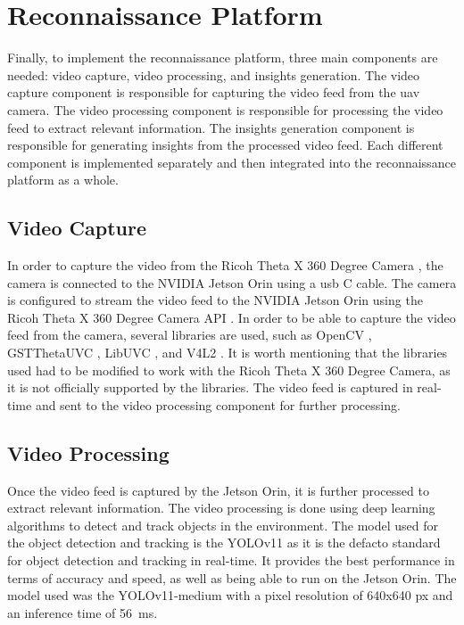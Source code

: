 \section{Reconnaissance Platform}\label{sec:implementation_reconnaissance_platform}

Finally, to implement the reconnaissance platform, three main components are needed: video capture, video processing, and insights generation. The video capture component is responsible for capturing the video feed from the \gls{uav} camera. The video processing component is responsible for processing the video feed to extract relevant information. The insights generation component is responsible for generating insights from the processed video feed. Each different component is implemented separately and then integrated into the reconnaissance platform as a whole.

\subsection{Video Capture}\label{subsec:implementation_video_capture}

In order to capture the video from the Ricoh Theta X 360 Degree Camera \autocite{ricohimagingTHETARicoh}, the camera is connected to the NVIDIA Jetson Orin \autocite{nvidiaNVIDIAJetson} using a \gls{usb} C cable. The camera is configured to stream the video feed to the NVIDIA Jetson Orin using the Ricoh Theta X 360 Degree Camera API \autocite{ricoh360ReferenceRicoh}. In order to be able to capture the video feed from the camera, several libraries are used, such as OpenCV \autocite{githubGitHubOpencvopencv}, GSTThetaUVC \autocite{githubGitHubBuburidergstthetauvc}, LibUVC \autocite{githubGitHub6GIntegration3UC3Mlibuvcthetasample}, and V4L2 \autocite{githubGitHubUmlaeutev4l2loopback}. It is worth mentioning that the libraries used had to be modified to work with the Ricoh Theta X 360 Degree Camera, as it is not officially supported by the libraries. The video feed is captured in real-time and sent to the video processing component for further processing.


\subsection{Video Processing}\label{subsec:implementation_video_processing}

Once the video feed is captured by the Jetson Orin, it is further processed to extract relevant information. The video processing is done using deep learning algorithms to detect and track objects in the environment. The model used for the object detection and tracking is the YOLOv11 \autocite{ultralyticsYOLO11} as it is the defacto standard for object detection and tracking in real-time. It provides the best performance in terms of accuracy and speed, as well as being able to run on the Jetson Orin. The model used was the YOLOv11-medium with a pixel resolution of 640x640 px and an inference time of \SI{56}{\milli\second}. 

